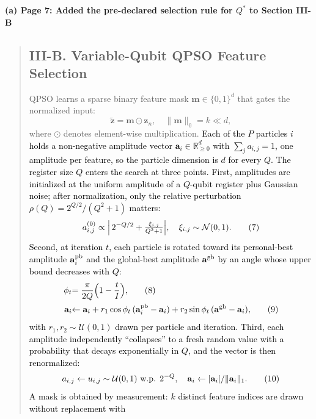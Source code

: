 \documentclass[11pt]{article}
\newenvironment{excerpt}{\begin{quote}\sloppy}{\end{quote}}
\newcommand{\mshead}[2]{\subsection*{\textbf{#1. #2}}}
\newcommand{\loc}[1]{\par\medskip\noindent\textbf{#1}\par}
\begin{document}
\loc{(a) Page 7: Added the pre-declared selection rule for $Q^{*}$ to Section III-B}
\begin{excerpt}
\mshead{III-B}{Variable-Qubit QPSO Feature Selection}


QPSO learns a sparse binary feature mask
$\mathbf{m}\in\{0,1\}^d$ that gates the normalized input:
\begin{equation}
\tilde{\mathbf{z}} = \mathbf{m}\odot\mathbf{z}_n,\quad
\|\mathbf{m}\|_0 = k \ll d,
\tag{6}
\end{equation}
where $\odot$ denotes element-wise multiplication.
\textcolor{black}{Each of the $P$ particles $i$ holds a
non-negative amplitude vector $\mathbf{a}_i\in\mathbb{R}_{\ge 0}^{d}$
with $\sum_j a_{i,j}=1$, one amplitude per feature, so the particle
dimension is $d$ for every $Q$. The register size $Q$ enters the
search at three points. First, amplitudes are initialized at the
uniform amplitude of a $Q$-qubit register plus Gaussian noise; after
normalization, only the relative perturbation
$\rho(Q)=2^{Q/2}/(Q^{2}+1)$ matters:}
\begin{equation}
\textcolor{black}{a_{i,j}^{(0)} \propto \Bigl|\,2^{-Q/2} +
\tfrac{\xi_{i,j}}{Q^{2}+1}\Bigr|,\quad
\xi_{i,j}\sim\mathcal{N}(0,1).}
\tag{7}
\end{equation}
\textcolor{black}{Second, at iteration $t$, each particle is
rotated toward its personal-best amplitude $\mathbf{a}_i^{\rm pb}$
and the global-best amplitude $\mathbf{a}^{\rm gb}$ by an angle whose
upper bound decreases with $Q$:}
\begin{align}
\textcolor{black}{\phi_t} &\textcolor{black}{= \frac{\pi}{2Q}\Bigl(1-\frac{t}{I}\Bigr),}
\tag{8}\\
\textcolor{black}{\mathbf{a}_i} &\textcolor{black}{\leftarrow \mathbf{a}_i
+ r_1\cos\phi_t\,(\mathbf{a}_i^{\rm pb}-\mathbf{a}_i)
+ r_2\sin\phi_t\,(\mathbf{a}^{\rm gb}-\mathbf{a}_i),}
\tag{9}
\end{align}
\textcolor{black}{with $r_1,r_2\sim\mathcal{U}(0,1)$ drawn per
particle and iteration. Third, each amplitude independently
``collapses'' to a fresh random value with a probability that decays
exponentially in $Q$, and the vector is then renormalized:}
\begin{equation}
\textcolor{black}{a_{i,j} \leftarrow u_{i,j}\sim\mathcal{U}(0,1)
\ \text{w.p. } 2^{-Q},\quad
\mathbf{a}_i \leftarrow |\mathbf{a}_i| / \|\mathbf{a}_i\|_1 .}
\tag{10}
\end{equation}
\textcolor{black}{A mask is obtained by measurement: $k$
distinct feature indices are drawn without replacement with
}
\end{excerpt}
\end{document}
